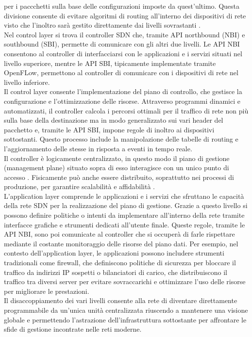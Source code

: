 per i paccchetti sulla base delle configurazioni imposte da quest'ultimo. 
Questa divisione consente di evitare algoritmi
di routing all'interno dei dispositivi di rete visto che l'inoltro sarà
gestito direttamente dai livelli sovrastanti \cite{tesiSDN:2017}. 
\\Nel control layer si trova il controller SDN che, tramite API northbound (NBI) e southbound (SBI), permette di comunicare con
gli altri due livelli. Le API NBI consentono al controller di interfacciarsi con le applicazioni e i servizi situati nel livello superiore,
mentre le API SBI, tipicamente implementate tramite OpenFLow, permettono al controller di comunicare con i dispositivi di rete nel livello inferiore.
\\Il control layer consente l'implementazione del piano di controllo, che gestisce la configurazione e l'ottimizzazione delle risorse. 
Attraverso programmi dinamici e automatizzati, il controller calcola i percorsi ottimali per il traffico di rete non più sulla base della destinazione ma in modo generalizzato sui vari header del pacchetto e, tramite le API SBI, impone regole di inoltro ai dispositivi sottostanti. 
Questo processo include la manipolazione delle tabelle di routing e l'aggiornamento delle stesse in risposta a eventi in tempo reale.
\\Il controller è logicamente centralizzato, in questo modo il piano di gestione (management plane) situato sopra di esso interagisce con un
unico punto di accesso \cite{tesiSDN:2020}. Fisicamente può anche essere distribuito, soprattutto nei processi di produzione, per garantire scalabilità e affidabilità \cite{sdnlayers}.
\\L'application layer comprende le applicazioni e i servizi che sfruttano le capacità della
rete SDN per la realizzazione del piano di gestione. Grazie a questo livello si possono
definire politiche o intenti da implementare all'interno della rete tramite interfacce grafiche e strumenti dedicati all'utente finale.
Queste regole, tramite le API NBI, sono poi comunicate al
controller che si occuperà di farle rispettare mediante il costante monitoraggio delle risorse del piano dati. 
Per esempio, nel contesto dell'application layer, le applicazioni possono includere strumenti tradizionali come firewall, che definiscono politiche di sicurezza per bloccare il traffico da indirizzi IP sospetti \cite{appl} o
bilanciatori di carico, che distribuiscono il traffico tra diversi server per evitare sovraccarichi
e ottimizzare l'uso delle risorse per migliorare le prestazioni. 
\\Il disaccoppiamento dei vari livelli consente alla rete di diventare direttamente programmabile da un'unica unità
centralizzata riuscendo a mantenere una visione globale e permettendo l'astrazione dell'infrastruttura sottostante per affrontare le sfide 
di gestione incontrate nelle reti moderne.


